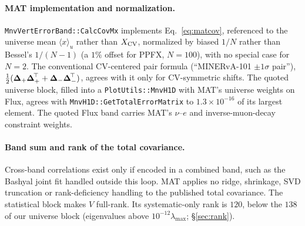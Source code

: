 \paragraph{MAT implementation and normalization.} \texttt{MnvVertErrorBand::CalcCovMx} implements Eq.~\eqref{eq:matcov}, referenced to the universe mean $\langle x\rangle_{u}$ rather than $X_{\text{CV}}$, normalized by biased $1/N$ rather than Bessel's $1/(N-1)$ (a $1\%$ offset for PPFX, $N=100$), with no special case for $N=2$. The conventional CV-centered pair formula (``MINERvA-101 $\pm1\sigma$ pair''), $\tfrac12(\boldsymbol{\Delta}_{+}\boldsymbol{\Delta}_{+}^{\!\top} + \boldsymbol{\Delta}_{-}\boldsymbol{\Delta}_{-}^{\!\top})$, agrees with it only for CV-symmetric shifts. The quoted universe block, filled into a \texttt{PlotUtils::MnvH1D} with MAT's universe weights on Flux, agrees with \texttt{MnvH1D::GetTotalErrorMatrix} to $1.3\times10^{-16}$ of its largest element. The quoted Flux band carries MAT's $\nu$--$e$ and inverse-muon-decay constraint weights.

\paragraph{Band sum and rank of the total covariance.} Cross-band correlations exist only if encoded in a combined band, such as the Bashyal joint fit handled outside this loop. MAT applies no ridge, shrinkage, SVD truncation or rank-deficiency handling to the published total covariance. The statistical block makes $V$ full-rank. Its systematic-only rank is $120$, below the $138$ of our universe block (eigenvalues above $10^{-12}\lambda_{\max}$; \S\ref{sec:rank}).

